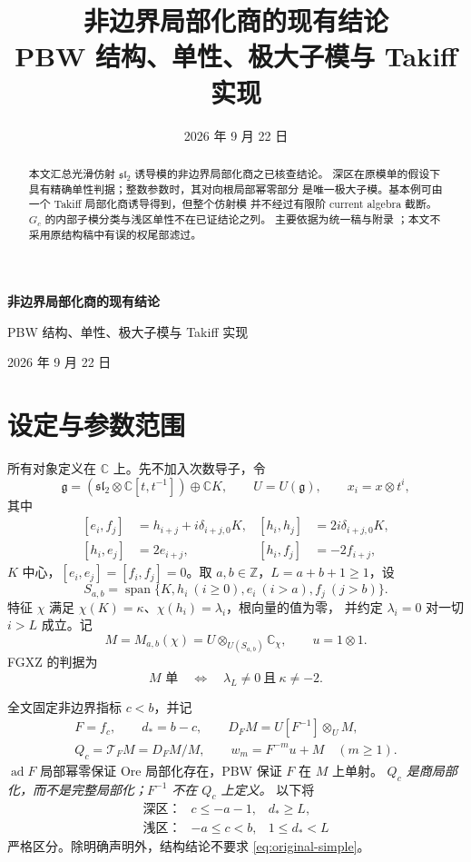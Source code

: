 \documentclass[UTF8,11pt,a4paper,fontset=fandol]{ctexart}
\title{\vspace{-10mm}非边界局部化商的现有结论\\[2pt]
\normalsize PBW 结构、单性、极大子模与 Takiff 实现}
\author{}
\date{2026 年 9 月 22 日}
\theoremstyle{upright}
\newcommand{\C}{\mathbb C}
\newcommand{\Z}{\mathbb Z}
\newcommand{\g}{\mathfrak g}
\newcommand{\slc}{\mathfrak{sl}_2}
\newcommand{\T}{\mathcal T}
\DeclareMathOperator{\ad}{ad}
\DeclareMathOperator{\Span}{span}
\begin{document}
\thispagestyle{plain}
\begin{center}
{\Large\bfseries 非边界局部化商的现有结论}\par\vspace{3pt}
{\normalsize PBW 结构、单性、极大子模与 Takiff 实现}\par\vspace{5pt}
{\small 2026 年 9 月 22 日}
\end{center}
\vspace{-3mm}
\begin{abstract}
本文汇总光滑仿射 $\slc$ 诱导模的非边界局部化商之已核查结论。
深区在原模单的假设下具有精确单性判据；整数参数时，其对向根局部幂零部分
是唯一极大子模。基本例可由一个 Takiff 局部化商诱导得到，但整个仿射模
并不经过有限阶 current algebra 截断。$G_c$ 的内部子模分类与浅区单性不在已证结论之列。
主要依据为统一稿与附录 \cite{Unified,Addendum}；本文不采用原结构稿中有误的权尾部滤过。
\end{abstract}

\section{设定与参数范围}

所有对象定义在 $\C$ 上。先不加入次数导子，令
\[
\g=(\slc\otimes\C[t,t^{-1}])\oplus\C K,\qquad U=U(\g),\qquad x_i=x\otimes t^i,
\]
其中
\[
\begin{aligned}
[e_i,f_j]&=h_{i+j}+i\delta_{i+j,0}K,& [h_i,h_j]&=2i\delta_{i+j,0}K,\\
[h_i,e_j]&=2e_{i+j},&[h_i,f_j]&=-2f_{i+j},
\end{aligned}
\]
$K$ 中心，$[e_i,e_j]=[f_i,f_j]=0$。取 $a,b\in\Z$，$L=a+b+1\ge1$，设
\[
S_{a,b}=\Span\{K,h_i\ (i\ge0),e_i\ (i>a),f_j\ (j>b)\}.
\]
特征 $\chi$ 满足 $\chi(K)=\kappa$、$\chi(h_i)=\lambda_i$，根向量的值为零，
并约定 $\lambda_i=0$ 对一切 $i>L$ 成立。记
\[
M=M_{a,b}(\chi)=U\otimes_{U(S_{a,b})}\C_\chi,\qquad u=1\otimes1.
\]
FGXZ 的判据为 \cite[Theorem 1.1]{FGXZ}
\begin{equation}\label{eq:original-simple}
M\text{ 单}\quad\Longleftrightarrow\quad \lambda_L\ne0\ \text{且}\ \kappa\ne-2.
\end{equation}

全文固定非边界指标 $c<b$，并记
\[
\begin{gathered}
F=f_c,\qquad d_*=b-c,\qquad D_FM=U[F^{-1}]\otimes_U M,\\
Q_c=\T_FM=D_FM/M,\qquad w_m=F^{-m}u+M\quad(m\ge1).
\end{gathered}
\]
$\ad F$ 局部幂零保证 Ore 局部化存在，PBW 保证 $F$ 在 $M$ 上单射。
\emph{$Q_c$ 是商局部化，而不是完整局部化；$F^{-1}$ 不在 $Q_c$ 上定义。}
以下将
\[
\begin{array}{lll}
\text{深区：}&c\le-a-1,&d_*\ge L,\\
\text{浅区：}&-a\le c<b,&1\le d_*<L
\end{array}
\]
严格区分。除明确声明外，结构结论不要求 \eqref{eq:original-simple}。
\end{document}
